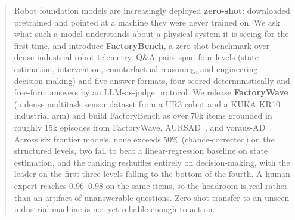%



\begin{abstract}
    Robot foundation models are increasingly deployed \textbf{zero-shot}: downloaded pretrained and pointed at a machine they were never trained on. We ask what such a model understands about a physical system it is seeing for the first time, and introduce \textbf{FactoryBench}, a zero-shot benchmark over dense industrial robot telemetry. Q\&A pairs span four levels (state estimation, intervention, counterfactual reasoning, and engineering decision-making) and five answer formats, four scored deterministically and free-form answers by an LLM-as-judge protocol. We release \textbf{FactoryWave} (a dense multitask sensor dataset from a UR3 cobot and a KUKA KR10 industrial arm) and build FactoryBench as over 70k items grounded in roughly 15k episodes from FactoryWave, AURSAD~\cite{leporowski2022aursad}, and voraus-AD~\cite{brockmann2023vorausad}. Across six frontier models, none exceeds 50\% (chance-corrected) on the structured levels, two fail to beat a linear-regression baseline on state estimation, and the ranking reshuffles entirely on decision-making, with the leader on the first three levels falling to the bottom of the fourth. A human expert reaches 0.96--0.98 on the same items, so the headroom is real rather than an artifact of unanswerable questions. Zero-shot transfer to an unseen industrial machine is not yet reliable enough to act on.
\end{abstract}

